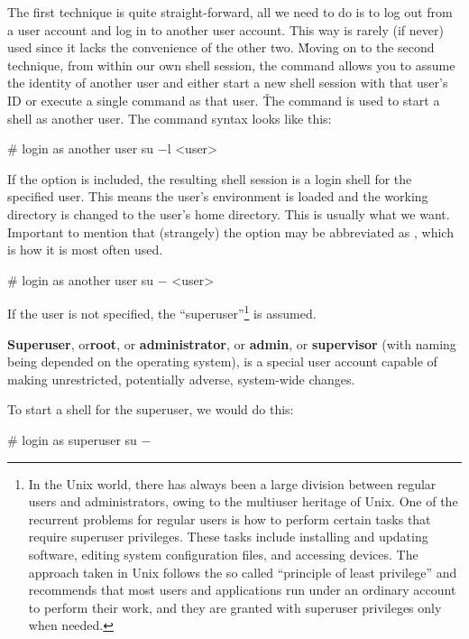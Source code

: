 The first technique is quite straight-forward, all we need to do is to log out from a user account and log in to another
user account. This way is rarely (if never) used since it lacks the convenience of the other two. \v

Moving on to the second technique, from within our own shell session, the  command allows you to assume the
identity of another user and either start a new shell session with that user's ID or execute a single command as that
user. \v

The  command is used to start a shell as another user. The command syntax looks like this:
\begin{bash}
# login as another user
su $-$l <user>
\end{bash}

If the  option is included, the resulting shell session is a login shell for the specified user. This means
the user's environment is loaded and the working directory is changed to the user's home directory. This is usually
what we want. Important to mention that (strangely) the  option may be abbreviated as \code{-}, which is how
it is most often used.

\begin{bash}
# login as another user
su $-$ <user>
\end{bash}

If the user is not specified, the ``superuser''\footnote{In the Unix world, there has always been a large division
between regular users and administrators, owing to the multiuser heritage of Unix. One of the recurrent problems for
regular users is how to perform certain tasks that require superuser privileges. These tasks include installing and
updating software, editing system configuration files, and accessing devices. The approach taken in Unix follows the so
called ``principle of least privilege'' and recommends that most users and applications run under an ordinary account
to perform their work, and they are granted with superuser privileges only when needed.} is assumed.

\textbf{Superuser}, or\textbf{root}, or \textbf{administrator}, or \textbf{admin}, or \textbf{supervisor} (with naming
being depended on the operating system), is a special user account capable of making unrestricted, potentially adverse,
system-wide changes.
\ed

To start a shell for the superuser, we would do this:
\begin{bash}
# login as superuser
su $-$
\end{bash}

